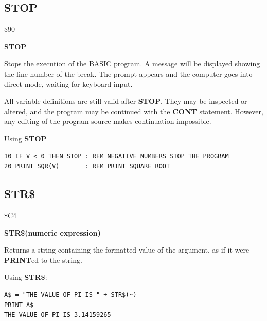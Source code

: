 
\newpage
\subsection{STOP}
\begin{description}[leftmargin=2cm,style=nextline]
\item [Token:] \$90
\item [Format:] {\bf STOP}
\item [Usage:] Stops the execution
               of the BASIC program.
               A message will be displayed showing the line number of the break.
               The  prompt
               appears and the computer goes into direct mode,
               waiting for keyboard input.

\item [Remarks:]
               All variable definitions are still valid after {\bf STOP}.
               They may be inspected or altered, and the
               program may be continued with the {\bf CONT}
               statement. However, any editing of the program source
               makes continuation impossible.

\item [Example:] Using {\bf STOP}
\begin{tcolorbox}[colback=black,coltext=white]
\verbatimfont{\codefont}
\begin{verbatim}
10 IF V < 0 THEN STOP : REM NEGATIVE NUMBERS STOP THE PROGRAM
20 PRINT SQR(V)       : REM PRINT SQUARE ROOT
\end{verbatim}
\end{tcolorbox}
\end{description}


\newpage
\subsection{STR\$}
\begin{description}[leftmargin=2cm,style=nextline]
\item [Token:] \$C4
\item [Format:] {\bf STR\$(numeric expression)}
\item [Usage:] Returns a string
               containing the formatted value of the argument,
               as if it were {\bf PRINT}ed to the string.

\item [Example:] Using {\bf STR\$}:
\begin{tcolorbox}[colback=black,coltext=white]
\verbatimfont{\codefont}
\begin{verbatim}
A$ = "THE VALUE OF PI IS " + STR$(~)
PRINT A$
THE VALUE OF PI IS 3.14159265
\end{verbatim}
\end{tcolorbox}
\end{description}

